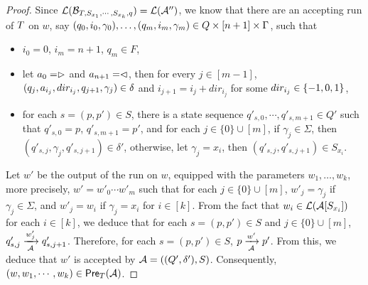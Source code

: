 \begin{proof}
Since $\mathcal{L}(\mathcal{B}_{T, S_{x_1}, \cdots, S_{x_k}, q})=\mathcal{L}(\mathcal{A}'')$, we know that  there are an accepting run of $T$ on $w$, 
say $(q_0, i_0, \gamma_0),\ldots, (q_m, i_m, \gamma_m) \in Q \times [n+1] \times \Gamma$, such that 
\begin{itemize}
\item $i_0=0$, $i_m = n+1$, $q_m \in F$, 
%
\item let $a_0 = \vartriangleright$ and $a_{n+1} = \vartriangleleft$,  then for every $j \in [m-1]$, $(q_j, a_{i_j}, dir_{i_j}, q_{j+1}, \gamma_j) \in
        \delta$ and $i_{j+1} = i_j + dir_{i_j}$ for some $dir_{i_j} \in \{-1, 0, 1\}$, 
 \item  for each $s=(p, p') \in S$, there is a state sequence $q'_{s, 0}, \cdots, q'_{s,m+1} \in Q'$ such that $q'_{s,0}= p$, $q'_{s, m+1} = p'$, and 
 for each $j \in \{0\} \cup [m]$, if $\gamma_j \in \Sigma$, then $(q'_{s, j}, \gamma_j, q'_{s, j+1}) \in \delta'$, otherwise, let $\gamma_j =x_i$, then $(q'_{s, j}, q'_{s, j+1}) \in S_{x_i}$.  
\end{itemize}
Let $w'$ be the output of the run on $w$, equipped with the parameters $w_1,\ldots, w_k$, more precisely, $w' = w'_0 \cdots w'_m$ such that for each $j \in \{0\} \cup [m]$, $w'_j = \gamma_j$ if $\gamma_j \in \Sigma$, and $w'_j = w_i$ if $\gamma_j = x_i$ for $i \in [k]$. From the fact that $w_i \in \mathcal{L}(\mathcal{A}[S_{x_i}])$ for each $i \in [k]$, we deduce that for each $s = (p,p') \in S$ and $j \in \{0\} \cup [m]$, $q'_{s, j} \xrightarrow[\mathcal{A}]{w'_j} q'_{s, j+1}$.
Therefore, for each $s = (p,p') \in S$, $p \xrightarrow[\mathcal{A}]{w'} p'$. From this, we deduce that $w'$ is accepted by $\mathcal{A}=((Q', \delta'), S)$.
Consequently, $(w, w_1,\cdots, w_k) \in \textsf{Pre}_{T}(\mathcal{A})$.
\end{proof}





